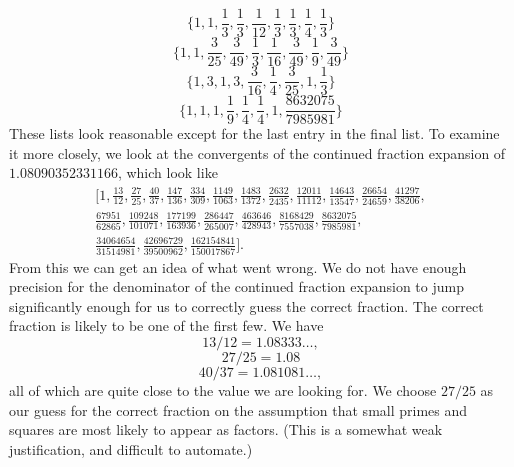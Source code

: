 \begin{equation*}
\big\{1,
1,
\frac{1}{3},
\frac{1}{3},
\frac{1}{12},
\frac{1}{3},
\frac{1}{3},
\frac{1}{4},
\frac{1}{3}\big\}
\end{equation*}
\begin{equation*}
\big\{1,
1,
\frac{3}{25},
\frac{3}{49},
\frac{1}{3},
\frac{1}{16},
\frac{3}{49},
\frac{1}{9},
\frac{3}{49}\big\}
\end{equation*}
\begin{equation*}
\big\{1,
3,
1,
3,
\frac{3}{16},
\frac{1}{4},
\frac{3}{25},
1,
\frac{1}{3}\big\}
\end{equation*}
\begin{equation*}
\big\{1,
1,
1,
\frac{1}{9},
\frac{1}{4},
\frac{1}{4},
1,
\frac{8632075}{7985981}\big\}
\end{equation*}
These lists look reasonable except for the last entry in the final list. To examine it more closely,
we look at the convergents of the continued fraction expansion of $1.08090352331166$, which look like
\begin{multline}
\big[1, \frac{13}{12}, \frac{27}{25}, \frac{40}{37}, \frac{147}{136}, \frac{334}{309}, \frac{1149}{1063},
\frac{1483}{1372}, \frac{2632}{2435}, \frac{12011}{11112}, \frac{14643}{13547}, \frac{26654}{24659},
\frac{41297}{38206}, \\ 
\frac{67951}{62865}, \frac{109248}{101071}, \frac{177199}{163936}, \frac{286447}{265007}, \frac{463646}{428943},
\frac{8168429}{7557038}, \frac{8632075}{7985981}, \\ \frac{34064654}{31514981}, \frac{42696729}{39500962},
\frac{162154841}{150017867}\big].
\end{multline}
From this we can get an idea of what went wrong. We do not have enough precision for the denominator of
the continued fraction expansion to jump significantly enough for us to correctly guess the correct fraction.
The correct fraction is likely to be one of the first few. We have
\[
    13/12 = 1.08333\ldots,
\]
\[
    27/25 = 1.08
\]
\[
    40/37 = 1.081081\ldots,
\]
all of which are quite close to the value we are looking for. We choose $27/25$ as our guess for the correct
fraction on the assumption that small primes and squares are most likely to appear as factors. (This is
a somewhat weak justification, and difficult to automate.)

